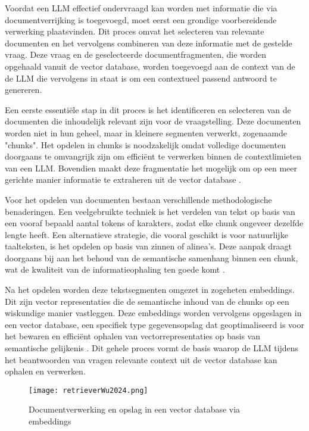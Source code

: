     Voordat een LLM effectief ondervraagd kan worden met informatie die via documentverrijking is toegevoegd, moet eerst een grondige voorbereidende verwerking plaatsvinden. Dit proces omvat het selecteren van relevante documenten en het vervolgens combineren van deze informatie met de gestelde vraag. Deze vraag en de geselecteerde documentfragmenten, die worden opgehaald vanuit de vector database, worden toegevoegd aan de context van de de LLM die vervolgens in staat is om een contextueel passend antwoord te genereren.
    
    Een eerste essentiële stap in dit proces is het identificeren en selecteren van de documenten die inhoudelijk relevant zijn voor de vraagstelling. Deze documenten worden niet in hun geheel, maar in kleinere segmenten verwerkt, zogenaamde "chunks". Het opdelen in chunks is noodzakelijk omdat volledige documenten doorgaans te omvangrijk zijn om efficiënt te verwerken binnen de contextlimieten van een LLM. Bovendien maakt deze fragmentatie het mogelijk om op een meer gerichte manier informatie te extraheren uit de vector database \autocite{Wu2024}.
    
    Voor het opdelen van documenten bestaan verschillende methodologische benaderingen. Een veelgebruikte techniek is het verdelen van tekst op basis van een vooraf bepaald aantal tokens of karakters, zodat elke chunk ongeveer dezelfde lengte heeft. Een alternatieve strategie, die vooral geschikt is voor natuurlijke taalteksten, is het opdelen op basis van zinnen of alinea’s. Deze aanpak draagt doorgaans bij aan het behoud van de semantische samenhang binnen een chunk, wat de kwaliteit van de informatieophaling ten goede komt \autocite{Wang2024}.
    
    Na het opdelen worden deze tekstsegmenten omgezet in zogeheten embeddings. Dit zijn vector representaties die de semantische inhoud van de chunks op een wiskundige manier vastleggen. Deze embeddings worden vervolgens opgeslagen in een vector database, een specifiek type gegevensopslag dat geoptimaliseerd is voor het bewaren en efficiënt ophalen van vectorrepresentaties op basis van semantische gelijkenis \autocite{Wu2024}. Dit gehele proces vormt de basis waarop de LLM tijdens het beantwoorden van vragen relevante context uit de vector database kan ophalen en verwerken.
   
     \begin{figure}[H]
        \centering
        \texttt{[image: retrieverWu2024.png]}
        \caption{Documentverwerking en opslag in een vector database via embeddings \cite{Wu2024}}
        \label{fig:RAG opmaken vector database}
    \end{figure}
    
